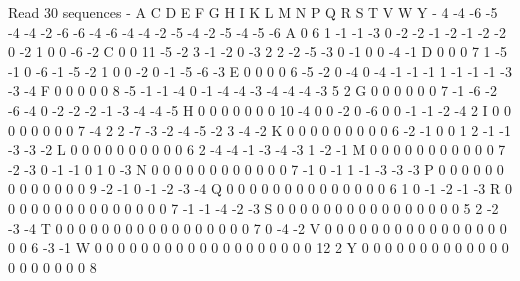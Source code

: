 Read 30 sequences
 	 -	 A	 C	 D	 E	 F	 G	 H	 I	 K	 L	 M	 N	 P	 Q	 R	 S	 T	 V	 W	 Y
-	 4	 -4	 -6	 -5	 -4	 -4	 -2	 -6	 -6	 -4	 -6	 -4	 -4	 -2	 -5	 -4	 -2	 -5	 -4	 -5	 -6
A	 0	 6	 1	 -1	 -1	 -3	 0	 -2	 -2	 -1	 -2	 -1	 -2	 -2	 0	 -2	 1	 0	 0	 -6	 -2
C	 0	 0	 11	 -5	 -2	 3	 -1	 -2	 0	 -3	 2	 2	 -2	 -5	 -3	 0	 -1	 0	 0	 -4	 -1
D	 0	 0	 0	 7	 1	 -5	 -1	 0	 -6	 -1	 -5	 -2	 1	 0	 0	 -2	 0	 -1	 -5	 -6	 -3
E	 0	 0	 0	 0	 6	 -5	 -2	 0	 -4	 0	 -4	 -1	 -1	 -1	 1	 -1	 -1	 -1	 -3	 -3	 -4
F	 0	 0	 0	 0	 0	 8	 -5	 -1	 -1	 -4	 0	 -1	 -4	 -4	 -3	 -4	 -4	 -4	 -3	 5	 2
G	 0	 0	 0	 0	 0	 0	 7	 -1	 -6	 -2	 -6	 -4	 0	 -2	 -2	 -2	 -1	 -3	 -4	 -4	 -5
H	 0	 0	 0	 0	 0	 0	 0	 10	 -4	 0	 0	 -2	 0	 -6	 0	 0	 -1	 -1	 -2	 -4	 2
I	 0	 0	 0	 0	 0	 0	 0	 0	 7	 -4	 2	 2	 -7	 -3	 -2	 -4	 -5	 -2	 3	 -4	 -2
K	 0	 0	 0	 0	 0	 0	 0	 0	 0	 6	 -2	 -1	 0	 0	 1	 2	 -1	 -1	 -3	 -3	 -2
L	 0	 0	 0	 0	 0	 0	 0	 0	 0	 0	 6	 2	 -4	 -4	 -1	 -3	 -4	 -3	 1	 -2	 -1
M	 0	 0	 0	 0	 0	 0	 0	 0	 0	 0	 0	 7	 -2	 -3	 0	 -1	 -1	 0	 1	 0	 -3
N	 0	 0	 0	 0	 0	 0	 0	 0	 0	 0	 0	 0	 7	 -1	 0	 -1	 1	 -1	 -3	 -3	 -3
P	 0	 0	 0	 0	 0	 0	 0	 0	 0	 0	 0	 0	 0	 9	 -2	 -1	 0	 -1	 -2	 -3	 -4
Q	 0	 0	 0	 0	 0	 0	 0	 0	 0	 0	 0	 0	 0	 0	 6	 1	 0	 -1	 -2	 -1	 -3
R	 0	 0	 0	 0	 0	 0	 0	 0	 0	 0	 0	 0	 0	 0	 0	 7	 -1	 -1	 -4	 -2	 -3
S	 0	 0	 0	 0	 0	 0	 0	 0	 0	 0	 0	 0	 0	 0	 0	 0	 5	 2	 -2	 -3	 -4
T	 0	 0	 0	 0	 0	 0	 0	 0	 0	 0	 0	 0	 0	 0	 0	 0	 0	 7	 0	 -4	 -2
V	 0	 0	 0	 0	 0	 0	 0	 0	 0	 0	 0	 0	 0	 0	 0	 0	 0	 0	 6	 -3	 -1
W	 0	 0	 0	 0	 0	 0	 0	 0	 0	 0	 0	 0	 0	 0	 0	 0	 0	 0	 0	 12	 2
Y	 0	 0	 0	 0	 0	 0	 0	 0	 0	 0	 0	 0	 0	 0	 0	 0	 0	 0	 0	 0	 8
